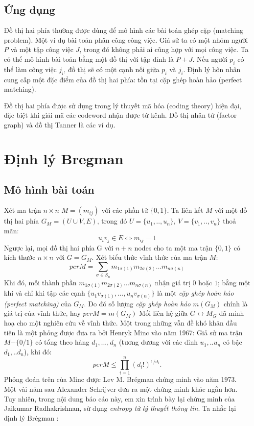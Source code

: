 \documentclass[a4paper, 12pt]{report}
\begin{document}
\subsection{Ứng dụng}
Đồ thị hai phía thường được dùng để mô hình các bài toán ghép cặp (matching problem). Một ví dụ bài toán phân công công việc. Giả sử ta có một nhóm người $P$ và một tập công việc $J$, trong đó không phải ai cũng hợp với mọi công việc. Ta có thể mô hình bài toán bằng một đồ thị với tập đỉnh là $ P + J$. Nếu người $p_i$ có thể làm công việc $j_i$, đồ thị sẽ có một cạnh nối giữa $p_i$ và $j_i$. Định lý hôn nhân cung cấp một đặc điểm của đồ thị hai phía: tồn tại cặp ghép hoàn hảo (perfect matching).

Đồ thị hai phía được sử dụng trong lý thuyết mã hóa (coding theory) hiện đại, đặc biệt khi giải mã các codeword nhận được từ kênh. Đồ thị nhân tử (factor graph) và đồ thị Tanner là các ví dụ.

\section{Định lý Bregman}
\subsection*{Mô hình bài toán}
Xét ma trận $n \times n$ $M =( m_{ij}) $ với các phần tử $\{0,1\}$. Ta liên kết $M$ với một đồ thị hai phía $G_{M} = (U \cup V ,E)$, trong đó $U=\{u_{1},..,u_{n}\}$, $V=\{v_{1},..,v_{n}\}$ thoả mãn: 
\begin{equation*}
    u_{i}v_{j} \in E \Longleftrightarrow m_{ij}=1
\end{equation*}
Ngược lại, mọi đồ thị hai phía G với $n+n$ nodes cho ta một ma trận $\{0,1\}$ có kích thước $n \times n$ với $G=G_M$. Xét biểu thức vĩnh thức của ma trận $M$:
\begin{equation*}
	per M = \displaystyle \sum_{\sigma \in S_{n}}m_{1\sigma(1)}m_{2\sigma(2)}...m_{n\sigma(n)}
\end{equation*}
Khi đó, mỗi thành phần $m_{1\sigma(1)}m_{2\sigma(2)}...m_{n\sigma(n)}$ nhận giá trị $0$ hoặc $1$; bằng một khi và chỉ khi tập các cạnh $\{u_{1}v_{\sigma(1)},...,u_{n}v_{\sigma(n)}\}$ là một \textit{cặp ghép hoàn hảo (perfect matching)} của $G_M$. Do đó số lượng \textit{cặp ghép hoàn hảo} $m(G_M)$ chính là giá trị của vĩnh thức, hay $per M = m(G_M)$
Mối liên hệ giữa $G \leftrightarrow M_G$ đã minh hoạ cho một nghiên cứu về vĩnh thức. Một trong những vẫn đề khó khăn đầu tiên là một phỏng được đưa ra bởi Henryk Minc vào năm 1967: Giả sử ma trận $M$$-\{0/1\}$ có tổng theo hàng $d_1,...,d_n$ (tương đương với các đỉnh $u_1,..u_n$ có bậc $d_1,..d_n$), khi đó:
\begin{equation*}
    per M \leq \prod_{i=1}^{n}(d_{i}!)^{1/d_{i}}.
\end{equation*}
Phỏng đoán trên của Minc được Lev M. Brégman chứng minh vào năm 1973. Một vài năm sau Alexander Schrijver đưa ra một chứng minh khác ngắn hơn. Tuy nhiên, trong nội dung báo cáo này, em xin trình bày lại chứng minh của Jaikumar Radhakrishnan, sử dụng \textit{entropy từ lý thuyết thông tin.} Ta nhắc lại định lý Brégman :
\end{document}
